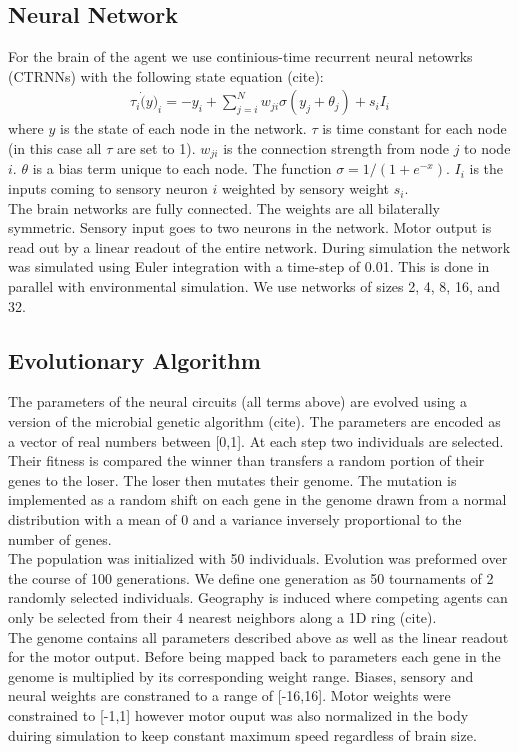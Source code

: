 \documentclass[letterpaper]{article}
\begin{document}
\subsection{Neural Network}
For the brain of the agent we use continious-time
recurrent neural netowrks (CTRNNs) with the following 
state equation (cite):
\begin{eqnarray} 
  \tau_i \dot(y)_i = -y_i + \sum_{j=i}^N w_{ji}\sigma(y_j+\theta_j)+s_i I_i
\end{eqnarray} 
where $y$ is the state of each node in the network. $\tau$ is time constant
for each node (in this case all $\tau$ are set to 1). $w_{ji}$ is the connection 
strength from node $j$ to node $i$.
$\theta$ is a bias term unique to each node. The function $\sigma = 1/(1+e^{-x})$.
$I_i$ is the inputs coming to sensory neuron $i$ weighted by sensory weight $s_i$.\\
The brain networks are fully connected. The weights are all bilaterally 
symmetric. Sensory input goes to two neurons in the network. Motor output is read
out by a linear readout of the entire network.
During simulation the network was simulated using Euler integration with a time-step
of 0.01. This is done in parallel with environmental simulation. We use networks of
sizes 2, 4, 8, 16, and 32.

\subsection{Evolutionary Algorithm}
The parameters of the neural circuits (all terms above) are evolved using a version
of the microbial genetic algorithm (cite). The parameters are encoded as a vector of real
numbers between [0,1]. At each step two individuals are selected. Their fitness is compared
the winner than transfers a random portion of their genes to the loser. The loser then mutates
their genome. The mutation is implemented as a random shift on each gene in the genome drawn
from a normal distribution with a mean of 0 and a variance inversely proportional to the number
of genes. \\
The population was initialized with 50 individuals. Evolution was preformed over the course of 
100 generations. We define one generation as 50 tournaments of 2 randomly selected individuals. 
Geography is induced where competing agents can only be selected from their 4 nearest neighbors 
along a 1D ring (cite).\\
The genome contains all parameters described above as well as the linear readout for the motor
output. Before being mapped back to parameters each gene in the genome is multiplied by its 
corresponding weight range. Biases, sensory and neural weights are constraned to a range of [-16,16].
Motor weights were constrained to [-1,1] however motor ouput was also normalized in the body duiring 
simulation to keep constant maximum speed regardless of brain size.
\end{document}
